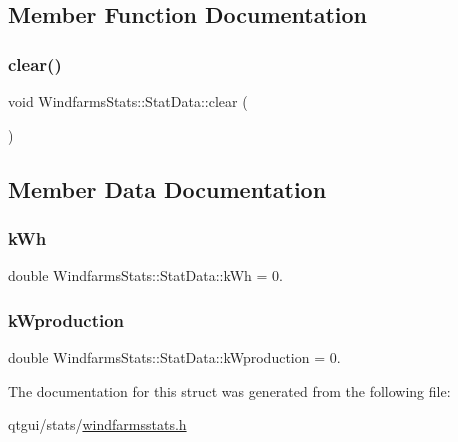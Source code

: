 \subsection{Member Function Documentation}
\mbox{\label{struct_windfarms_stats_1_1_stat_data_ab4abd0b7ea7c2c9497ef6beebbe205ef}} 
\subsubsection{\texorpdfstring{clear()}{clear()}}
{\footnotesize\ttfamily void Windfarms\+Stats\+::\+Stat\+Data\+::clear (\begin{DoxyParamCaption}{ }\end{DoxyParamCaption})\hspace{0.3cm}{\ttfamily [inline]}}



\subsection{Member Data Documentation}
\mbox{\label{struct_windfarms_stats_1_1_stat_data_a7450fb4d92e4d3573d276aa155a438da}} 
\subsubsection{\texorpdfstring{kWh}{kWh}}
{\footnotesize\ttfamily double Windfarms\+Stats\+::\+Stat\+Data\+::k\+Wh = 0.}

\mbox{\label{struct_windfarms_stats_1_1_stat_data_a56fd3120881cc0b82fcfcb9ab99932ab}} 
\subsubsection{\texorpdfstring{kWproduction}{kWproduction}}
{\footnotesize\ttfamily double Windfarms\+Stats\+::\+Stat\+Data\+::k\+Wproduction = 0.}



The documentation for this struct was generated from the following file\+:\begin{DoxyCompactItemize}
\item 
qtgui/stats/\mbox{\hyperlink{windfarmsstats_8h}{windfarmsstats.\+h}}\end{DoxyCompactItemize}
